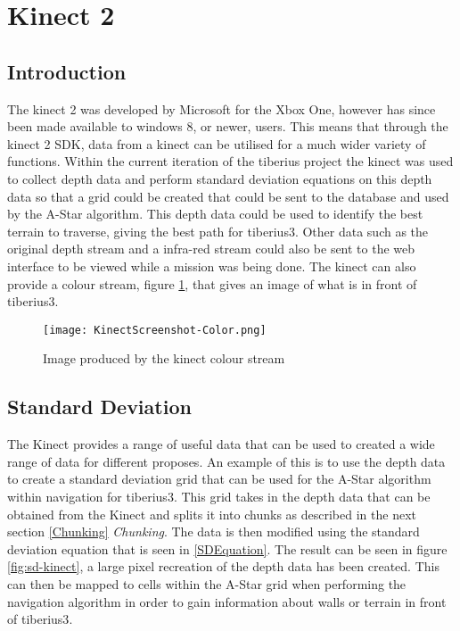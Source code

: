 \section{Kinect 2}

\subsection{Introduction}
The kinect 2 was developed by Microsoft for the Xbox One, however has since been made available to windows 8, or newer, users. This means that through the kinect 2 SDK, data from a kinect can be utilised for a much wider variety of functions. Within the current iteration of the tiberius project the kinect was used to collect depth data and perform standard deviation equations on this depth data so that a grid could be created that could be sent to the database and used by the A-Star algorithm. This depth data could be used to identify the best terrain to traverse, giving the best path for \gls{tiberius3}. Other data such as the original depth stream and a infra-red stream could also be sent to the web interface to be viewed while a mission was being done. The kinect can also provide a colour stream, figure \ref{fig:kinect-color}, that gives an image of what is in front of \gls{tiberius3}.

\begin{figure}[!htb]
\begin{center}
\texttt{[image: KinectScreenshot-Color.png]}
\end{center}
\caption{Image produced by the kinect colour stream}
\label{fig:kinect-color}
\end{figure}

\subsection{Standard Deviation}\label{StandardDeviation}
The Kinect provides a range of useful data that can be used to created a wide range of data for different proposes. An example of this is to use the depth data to create a standard deviation grid that can be used for the A-Star algorithm within navigation for \gls{tiberius3}. This grid takes in the depth data that can be obtained from the Kinect and splits it into chunks as described in the next section \ref{Chunking} \textit{Chunking}. The data is then modified using the standard deviation equation that is seen in \ref{SDEquation}. The result can be seen in figure \ref{fig:sd-kinect}, a large pixel recreation of the depth data has been created. This can then be mapped to cells within the A-Star grid when performing the navigation algorithm in order to gain information about walls or terrain in front of \gls{tiberius3}.

